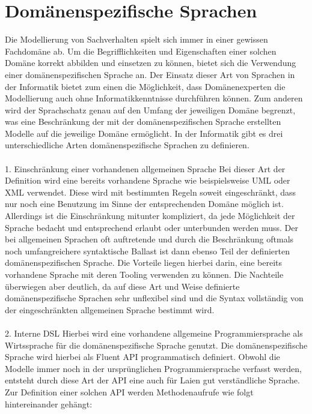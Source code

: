 \documentclass[11pt,a4paper,bibtotocnumbered]{scrreprt}
\begin{document}
\section{Domänenspezifische Sprachen}
Die Modellierung von Sachverhalten spielt sich immer in einer gewissen Fachdomäne ab. Um die Begrifflichkeiten und Eigenschaften einer solchen Domäne korrekt abbilden und einsetzen zu können, bietet sich die Verwendung einer domänenspezifischen Sprache an. Der Einsatz dieser Art von Sprachen in der Informatik bietet zum einen die Möglichkeit, dass Domänenexperten die Modellierung auch ohne Informatikkenntnisse durchführen können. Zum anderen wird der Sprachschatz genau auf den Umfang der jeweiligen Domäne begrenzt, was eine Beschränkung der mit der domänenspezifischen Sprache erstellten Modelle auf die jeweilige Domäne ermöglicht.
In der Informatik gibt es drei unterschiedliche Arten domänenspezifische Sprachen zu definieren.
\\
\\
1. Einschränkung einer vorhandenen allgemeinen Sprache
Bei dieser Art der Definition wird eine bereits vorhandene Sprache wie beispielsweise UML oder XML verwendet. Diese wird mit bestimmten Regeln soweit eingeschränkt, dass nur noch eine Benutzung im Sinne der entsprechenden Domäne möglich ist. Allerdings ist die Einschränkung mitunter kompliziert, da jede Möglichkeit der Sprache bedacht und entsprechend erlaubt oder unterbunden werden muss. Der bei allgemeinen Sprachen oft auftretende und durch die Beschränkung oftmals noch umfangreichere syntaktische Ballast ist dann ebenso Teil der definierten domänenspezifischen Sprache. Die Vorteile liegen hierbei darin, eine bereits vorhandene Sprache mit deren Tooling verwenden zu können. Die Nachteile überwiegen aber deutlich, da auf diese Art und Weise definierte domänenspezifische Sprachen sehr unflexibel sind und die Syntax vollständig von der eingeschränkten allgemeinen Sprache bestimmt wird.
\\
\\
2. Interne DSL
Hierbei wird eine vorhandene allgemeine Programmiersprache als Wirtssprache für die domänenspezifische Sprache genutzt. Die domänenspezifische Sprache wird hierbei als Fluent API programmatisch definiert. Obwohl die Modelle immer noch in der ursprünglichen Programmiersprache verfasst werden, entsteht durch diese Art der API eine auch für Laien gut verständliche Sprache. Zur Definition einer solchen API werden Methodenaufrufe wie folgt hintereinander gehängt:
\\
\\
\end{document}
